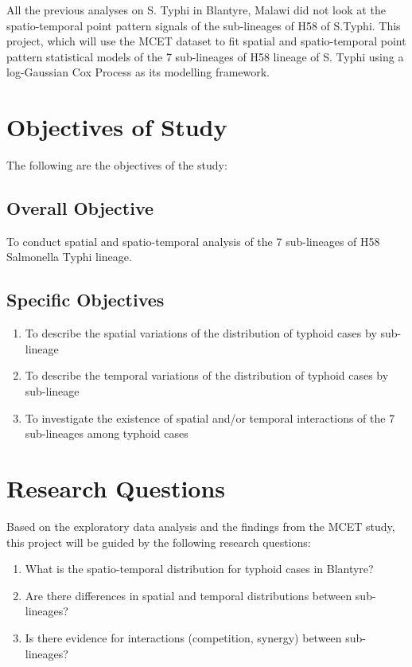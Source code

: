 \documentclass[a4paper]{thesis}
\begin{document}
All the previous analyses on S. Typhi in Blantyre, Malawi did not look at the spatio-temporal point pattern signals of the sub-lineages of H58 of S.Typhi. This project, which will use the MCET dataset to fit spatial and spatio-temporal point pattern statistical models of the 7 sub-lineages of H58 lineage of S. Typhi using a log-Gaussian Cox Process as its modelling framework. 

\section{Objectives of Study}
The following are the objectives of the study:

\subsection{Overall Objective}
To conduct spatial and spatio-temporal analysis of the 7 sub-lineages of H58 Salmonella Typhi lineage.

\subsection{Specific Objectives} 

\begin{enumerate}
\item To describe the spatial variations of the distribution of typhoid cases by sub-lineage

\item To describe the temporal variations of the distribution of typhoid cases by sub-lineage

\item To investigate the existence of spatial and/or temporal interactions of the 7 sub-lineages among typhoid cases

\end{enumerate}

\section{Research Questions}

Based on the exploratory data analysis and the findings from the MCET study, this project will be guided by the following research questions:

\begin{enumerate}
\item What is the spatio-temporal distribution for typhoid cases in Blantyre?
\item Are there differences in spatial and temporal distributions between sub-lineages?
\item Is there evidence for interactions (competition, synergy) between sub-lineages?
\end{enumerate}
\end{document}
